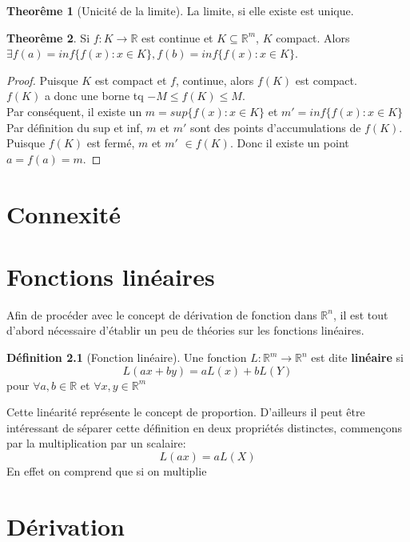 \documentclass[12pt]{book}
\let\Bbb\mathbb
\newcommand\todo[1]{\phantom{#1}}
\theoremstyle{definition}
\newtheorem{definition}{Définition}[section]
\newtheorem{theorem}{Theorême}[section]
\begin{document}
\begin{theorem}[Unicité de la limite]
    \label{thm:limite_unique}
    La limite, si elle existe est unique.
\end{theorem}

\begin{theorem}
    Si $f: K \to \Bbb R$ est continue et $K \subseteq \Bbb R^m$, $K$ compact. Alors $\exists f(a) = inf\{f(x) : x \in K\}, f(b) = inf\{f(x) : x \in K\}$.
\end{theorem}


\begin{proof}
    Puisque $K$ est compact et $f$, continue, alors $f(K)$ est compact.\\
    $f(K)$ a donc une borne tq $-M \leq f(K) \leq M$.\\
    Par conséquent, il existe un $m = sup\{f(x): x \in K\}$ et $m' = inf\{f(x): x \in K\}$\\
    Par définition du sup et inf, $m$ et  $m'$ sont des points d'accumulations de $f(K)$.\\
    Puisque $f(K)$ est fermé, $m$ et $m'$ $\in f(K)$. Donc il existe un point $a = f(a) = m$.
\end{proof}

\chapter{Connexité}
\chapter{Fonctions linéaires}
\todo{Move this to algebre lineaire}
Afin de procéder avec le concept de dérivation de fonction dans $\Bbb R^n$, il est tout d'abord 
nécessaire d'établir un peu de théories sur les fonctions linéaires.
\begin{definition}[Fonction linéaire]
    \label{def:fonction_lineaire}
    Une fonction $L: \Bbb R^m \to \Bbb R^n$ est dite \textbf{linéaire} si
    $$ L(ax + by) = aL(x) + bL(Y) $$
    pour $\forall a,b \in \Bbb R$ et $\forall x,y \in \Bbb R^m$ 
\end{definition}
Cette linéarité représente le concept de proportion. D'ailleurs il peut être intéressant de séparer 
cette définition en deux propriétés distinctes, commençons par la multiplication par un scalaire:
$$ L(ax) = aL(X) $$
En effet on comprend que si on multiplie
\chapter{Dérivation}
\end{document}
